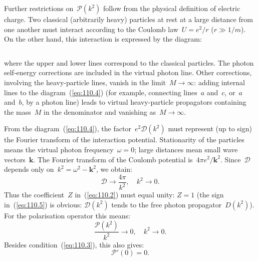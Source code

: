 Further restrictions on~$\mathcal{P}(k^2)$ follow from the physical definition of electric charge. Two classical (arbitrarily heavy) particles at rest at a large distance from one another must interact according to the Coulomb law~$U = e^2/r$ ($r \gg 1/m$). On the other hand, this interaction is expressed by the diagram:

\begin{equation}
\label{eq:110.4}
\end{equation}

\noindent where the upper and lower lines correspond to the classical particles. The photon self-energy corrections are included in the virtual photon line. Other corrections, involving the heavy-particle lines, vanish in the limit~$M \to \infty$: adding internal lines to the diagram~(\ref{eq:110.4}) (for example, connecting lines~$a$ and~$c$, or~$a$ and~$b$, by a photon line) leads to virtual heavy-particle propagators containing the mass~$M$ in the denominator and vanishing as~$M \to \infty$.


From the diagram~(\ref{eq:110.4}), the factor~$e^2\mathcal{D}(k^2)$ must represent (up to sign) the Fourier transform of the interaction potential. Stationarity of the particles means the virtual photon frequency~$\omega = 0$; large distances mean small wave vectors~$\mathbf{k}$. The Fourier transform of the Coulomb potential is~$4\pi e^2/\mathbf{k}^2$. Since~$\mathcal{D}$ depends only on~$k^2 = \omega^2 - \mathbf{k}^2$, we obtain:
\begin{equation}
\mathcal{D} \to \frac{4\pi}{k^2}, \quad k^2 \to 0.
\label{eq:110.5}
\end{equation}
Thus the coefficient~$Z$ in~(\ref{eq:110.2}) must equal unity: $Z = 1$ (the sign in~(\ref{eq:110.5}) is obvious: $\mathcal{D}(k^2)$ tends to the free photon propagator~$D(k^2)$). For the polarisation operator this means:
\begin{equation}
\frac{\mathcal{P}(k^2)}{k^2} \to 0, \quad k^2 \to 0.
\label{eq:110.6}
\end{equation}
Besides condition~(\ref{eq:110.3}), this also gives:
\begin{equation}
\mathcal{P}'(0) = 0.
\label{eq:110.7}
\end{equation}


